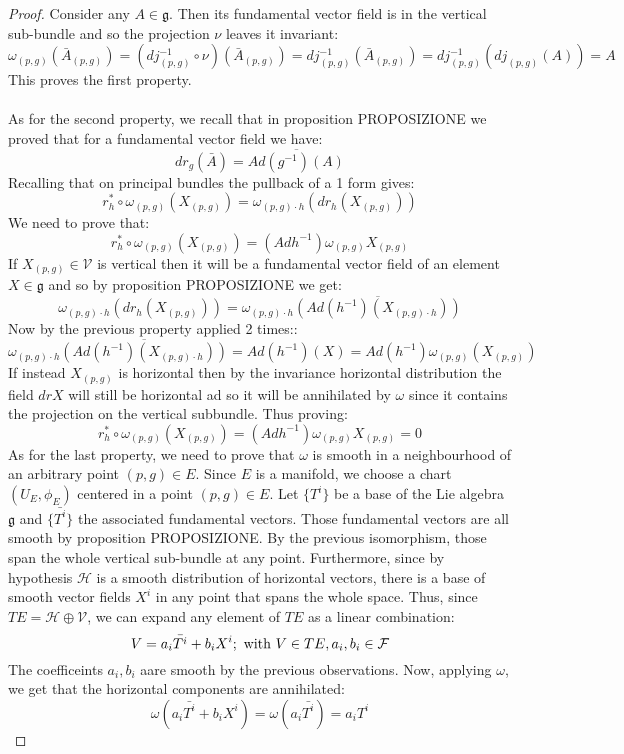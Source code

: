 \documentclass[12pt,a4paper]{report}
\theoremstyle{definition}
\theoremstyle{Theorem}
\theoremstyle{definition}
\theoremstyle{definition}
\theoremstyle{definition}
\begin{document}
		\begin{proof}
			Consider any $A\in\mathfrak{g}$. Then its fundamental vector field is in the vertical sub-bundle and so the projection $\nu$ leaves it invariant:
			$$\omega_{(p,g)}(\bar{A}_{(p,g)})=(dj_{(p,g)}^{-1}\circ \nu)(\bar{A}_{(p,g)})=dj_{(p,g)}^{-1}(\bar{A}_{(p,g)})=
			dj_{(p,g)}^{-1}(dj_{(p,g)}(A))=A$$
			This proves the first property.\\
			\\
			As for the second property, we recall that in proposition PROPOSIZIONE we proved that for a fundamental vector field  we have:
			$$dr_g(\bar{A})=\overline{Ad(g^{-1})(A)}$$
			Recalling that on principal bundles the pullback of a 1 form gives:
			$$r^*_h\circ \omega_{(p,g)}(X_{(p,g)})=\omega_{(p,g)\cdot h}(dr_h(X_{(p,g)}))$$
			We need to prove that:
			$$r^*_h\circ \omega_{(p,g)}(X_{(p,g)})=(Adh^{-1})\omega_{(p,g)}X_{(p,g)}$$
			If $X_{(p,g)}\in\mathcal{V}$ is vertical then it will be a fundamental vector field of an element $X\in\mathfrak{g}$ and so by proposition PROPOSIZIONE we get:
			$$\omega_{(p,g)\cdot h}(dr_h(X_{(p,g)}))=\omega_{(p,g)\cdot h}\overline{(Ad(h^{-1})(X_{(p,g)\cdot h}))}$$
			Now by the previous property applied 2 times::
			$$\omega_{(p,g)\cdot h}\overline{(Ad(h^{-1})(X_{(p,g)\cdot h}))}=Ad(h^{-1})(X)=Ad(h^{-1})\omega_{(p,g)}(X_{(p,g)})$$
			If instead $X_{(p,g)}$ is horizontal then by the invariance horizontal distribution the field $dr X$ will still be horizontal ad so it will be annihilated by $\omega$ since it contains the projection on the vertical subbundle. Thus proving:
			$$r^*_h\circ \omega_{(p,g)}(X_{(p,g)})=(Adh^{-1})\omega_{(p,g)}X_{(p,g)}=0$$
			As for the last property, we need to prove that $\omega$ is smooth in a neighbourhood of an arbitrary point $(p,g)\in E$. Since $E$ is a manifold, we choose a chart $(U_E,\phi_E)$ centered in a point $(p,g)\in E$. Let $\{T^i\}$ be a base of the Lie algebra $\mathfrak{g}$ and $\{\bar{T^i}\}$ the associated fundamental vectors. Those fundamental vectors are all smooth by proposition PROPOSIZIONE. By the previous isomorphism, those span the whole vertical sub-bundle at any point. Furthermore, since by hypothesis $\mathcal{H}$ is a smooth distribution  of horizontal vectors, there is a base of smooth vector fields $X^i$ in any point that spans the whole space. Thus, since $TE=\mathcal{H}\oplus\mathcal{V}$, we can expand any element of $TE$ as a linear combination:
			$$V=a_i \bar{T^i}+b_iX^i;\hbox{ with } V\in TE, a_i,b_i\in \mathcal{F}$$
			The coefficeints $a_i,b_i$ aare smooth by the previous observations. Now, applying $\omega$, we get that the horizontal components are annihilated:
			$$\omega(a_i \bar{T^i}+b_iX^i)=\omega(a_i \bar{T^i})=a_i T^i$$
		\end{proof}
\end{document}
